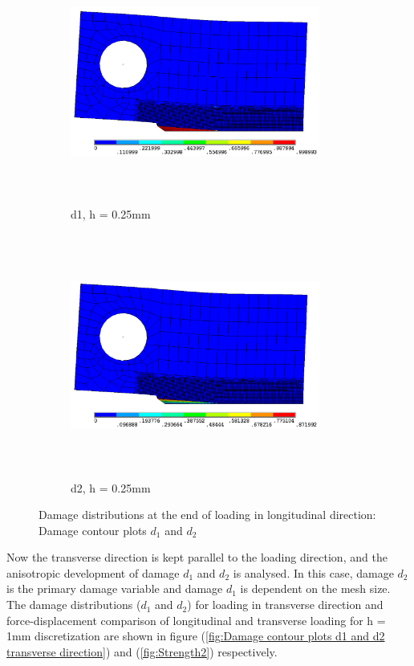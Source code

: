 \documentclass[12pt,a4paper,twoside,openright]{report}
\begin{document}
\begin{figure}[htbp!]\ContinuedFloat
     \begin{subfigure}{0.4\textwidth}
         \includegraphics[width=8.2cm,height=8cm,keepaspectratio]{26.d1-0.25.png}
         \caption{d1, h = 0.25mm}
         \label{fig:d1-0.25}
     \end{subfigure}
     \hspace{2cm}
     \begin{subfigure}{0.4\textwidth}
         \includegraphics[width=8.2cm,height=8cm,keepaspectratio]{26.d2-0.25.png}
         \caption{d2, h = 0.25mm}
         \label{fig:d2-0.25}
     \end{subfigure}     
        \caption{Damage distributions at the end of loading in longitudinal direction: Damage contour plots $d_{1}$ and $d_{2}$ }
        \label{fig: Damage contour plots d1 and d2}     
\end{figure}
\FloatBarrier 
\indent\indent\indent Now the transverse direction is kept parallel to the loading direction, and the anisotropic development of damage $d_{1}$ and $d_{2}$ is analysed. In this case, damage $d_{2}$ is the primary damage variable and damage $d_{1}$ is dependent on the mesh size.  The damage distributions ($d_{1}$ and $d_{2}$) for loading in transverse direction and force-displacement comparison of  longitudinal and transverse loading for h = 1mm discretization are shown in figure (\ref{fig:Damage contour plots d1 and d2 transverse direction}) and (\ref{fig:Strength2}) respectively.\\\\
\end{document}
